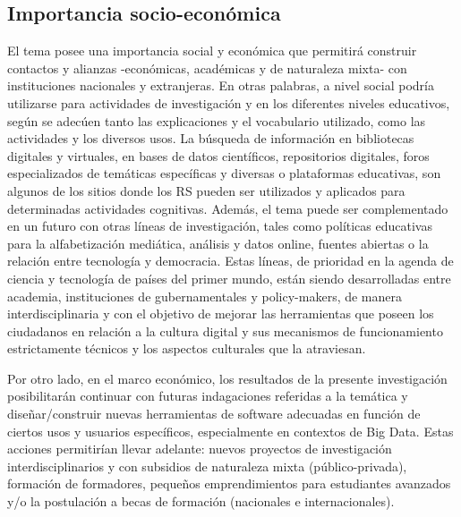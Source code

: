 \subsection{Importancia socio-económica}
El tema posee una importancia social y económica que permitirá construir contactos y alianzas -económicas, académicas y de naturaleza mixta- con instituciones nacionales y extranjeras. En otras palabras, a nivel social podría utilizarse para actividades de investigación y en los diferentes niveles educativos, según se adecúen tanto las explicaciones y el vocabulario utilizado, como las actividades y los diversos usos. La búsqueda de información en bibliotecas digitales y virtuales, en bases de datos científicos, repositorios digitales, foros especializados de temáticas específicas y diversas o plataformas educativas, son algunos de los sitios donde los RS pueden ser utilizados y aplicados para determinadas actividades cognitivas. Además, el tema puede ser complementado en un futuro con otras líneas de investigación, tales como políticas educativas para la alfabetización mediática, análisis y datos online, fuentes abiertas o la relación entre tecnología y democracia. Estas líneas, de prioridad en la agenda de ciencia y tecnología de países del primer mundo, están siendo desarrolladas entre academia, instituciones de gubernamentales y policy-makers, de manera interdisciplinaria y con el objetivo de mejorar las herramientas que poseen los ciudadanos en relación a la cultura digital y sus mecanismos de funcionamiento estrictamente técnicos y los aspectos culturales que la atraviesan.

\bigskip Por otro lado, en el marco económico, los resultados de la presente investigación posibilitarán continuar con futuras indagaciones referidas a la temática y diseñar/construir nuevas herramientas de software adecuadas en función de ciertos usos y usuarios específicos, especialmente en contextos de Big Data. Estas acciones permitirían llevar adelante: nuevos proyectos de investigación interdisciplinarios y con subsidios de naturaleza mixta (público-privada), formación de formadores, pequeños emprendimientos para estudiantes avanzados y/o la postulación a becas de formación (nacionales e internacionales).



